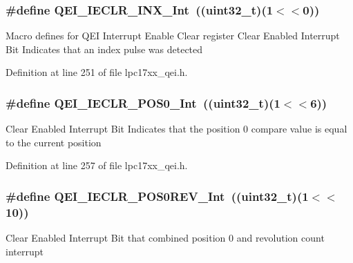 \hypertarget{group___q_e_i___private___macros_ga3a37cc95d30d54e63c8acefeadce25e0}{
\subsubsection[{\-Q\-E\-I\-\_\-\-I\-E\-C\-L\-R\-\_\-\-I\-N\-X\-\_\-\-Int}]{\setlength{\rightskip}{0pt plus 5cm}\#define {\bf \-Q\-E\-I\-\_\-\-I\-E\-C\-L\-R\-\_\-\-I\-N\-X\-\_\-\-Int}~((uint32\-\_\-t)(1$<$$<$0))}}\label{group___q_e_i___private___macros_ga3a37cc95d30d54e63c8acefeadce25e0}
\-Macro defines for \-Q\-E\-I \-Interrupt \-Enable \-Clear register \-Clear \-Enabled \-Interrupt \-Bit \-Indicates that an index pulse was detected 

\-Definition at line 251 of file lpc17xx\-\_\-qei.\-h.

\hypertarget{group___q_e_i___private___macros_ga9deea0e734a9424dbf76e40f60001e54}{
\subsubsection[{\-Q\-E\-I\-\_\-\-I\-E\-C\-L\-R\-\_\-\-P\-O\-S0\-\_\-\-Int}]{\setlength{\rightskip}{0pt plus 5cm}\#define {\bf \-Q\-E\-I\-\_\-\-I\-E\-C\-L\-R\-\_\-\-P\-O\-S0\-\_\-\-Int}~((uint32\-\_\-t)(1$<$$<$6))}}\label{group___q_e_i___private___macros_ga9deea0e734a9424dbf76e40f60001e54}
\-Clear \-Enabled \-Interrupt \-Bit \-Indicates that the position 0 compare value is equal to the current position 

\-Definition at line 257 of file lpc17xx\-\_\-qei.\-h.

\hypertarget{group___q_e_i___private___macros_gaee1cb87b1e89699f2cc31e629085d4cd}{
\subsubsection[{\-Q\-E\-I\-\_\-\-I\-E\-C\-L\-R\-\_\-\-P\-O\-S0\-R\-E\-V\-\_\-\-Int}]{\setlength{\rightskip}{0pt plus 5cm}\#define {\bf \-Q\-E\-I\-\_\-\-I\-E\-C\-L\-R\-\_\-\-P\-O\-S0\-R\-E\-V\-\_\-\-Int}~((uint32\-\_\-t)(1$<$$<$10))}}\label{group___q_e_i___private___macros_gaee1cb87b1e89699f2cc31e629085d4cd}
\-Clear \-Enabled \-Interrupt \-Bit that combined position 0 and revolution count interrupt 

